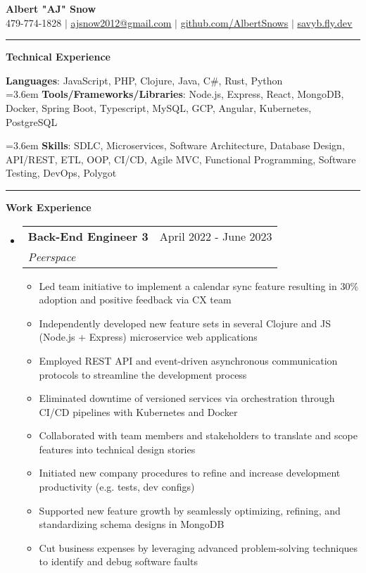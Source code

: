 \documentclass[letterpaper,11pt]{article}
\makeatletter
\newcommand{\resumeItem}[1]{
  \item\small{
    {#1 \vspace{-2pt}}
  }
}
\newcommand{\resumeSubheading}[4]{
  \vspace{-2pt}\item
    \begin{tabular*}{0.97\textwidth}[t]{l@{\extracolsep{\fill}}r}
      \textbf{#1} & #2 \\
      \textit{\small#3} & \textit{\small #4} \\
    \end{tabular*}\vspace{0pt}
}
\newcommand{\resumeSubHeadingListStart}{\begin{itemize}[leftmargin=0.15cm, label={}]}
\newcommand{\resumeSubHeadingListEnd}{\end{itemize}}
\newcommand{\resumeItemListStart}{\begin{itemize}}
\newcommand{\resumeItemListEnd}{\end{itemize}\vspace{-5pt}}
\makeatother
\begin{document}
\textbf{\normalshape \Large \textcolor{magic_blue}{Albert "AJ" Snow}} \\ \vspace{3pt}
\small 479-774-1828 $|$ 
\href{ mailto:ajsnow2012@gmail.com }
{\underline{ajsnow2012@gmail.com}} $|$
\href{https://github.com/AlbertSnows}{\underline{github.com/AlbertSnows}}
$|$ \href{https://savyb.fly.dev/}{\underline{savyb.fly.dev}}
\noindent\rule{19.5cm}{0.4pt}


%
\textbf{\large \textcolor{magic_blue}{Technical Experience} }
\begin{onehalfspace}

    \textbf{ Languages}{: JavaScript, PHP, Clojure, Java, 
    C\#, Rust, Python } \\

    \hangindent=3.6em
    \textbf{ Tools/Frameworks/Libraries}{: 
    Node.js, Express, React, MongoDB, Docker, Spring Boot, 
    Typescript, MySQL, GCP, Angular, Kubernetes, PostgreSQL } \\
\end{onehalfspace}

\hangindent=3.6em
\textbf{ Skills}{: }
SDLC, Microservices, Software Architecture, Database Design, 
API/REST,  ETL, 
OOP, CI/CD, Agile
MVC, Functional Programming, Software Testing, 
DevOps, Polygot

\noindent\rule{19.5cm}{0.4pt}

\textbf{\large \textcolor{magic_blue}{Work Experience}}
\resumeSubHeadingListStart
\resumeSubheading
{Back-End Engineer 3}{April 2022 - June 2023}
{Peerspace}{}
\resumeItemListStart
\resumeItem{ Led team initiative to implement a calendar sync feature resulting in 30\% adoption and positive feedback via CX team}
\resumeItem{ Independently developed new feature sets in several Clojure and JS (Node.js + Express) microservice web applications}
\resumeItem{ Employed REST API and event-driven asynchronous communication protocols to streamline the development process}
\resumeItem{ Eliminated downtime of versioned services via orchestration through CI/CD pipelines with Kubernetes and Docker }
\resumeItem{ Collaborated with team members and stakeholders to translate and scope features into technical design stories}
\resumeItem{ Initiated new company procedures to refine and increase development productivity (e.g. tests, dev configs)}
\resumeItem{ Supported new feature growth by seamlessly optimizing, refining, and standardizing schema designs in MongoDB}
\resumeItem{ Cut business expenses by leveraging advanced problem-solving techniques to identify and debug software faults}
\resumeItemListEnd
\resumeSubHeadingListEnd
\end{document}
